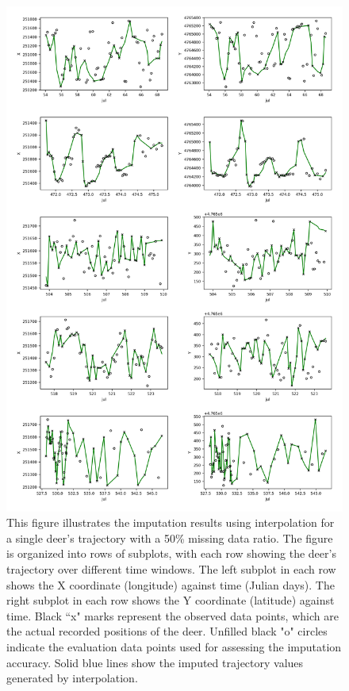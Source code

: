 \documentclass[11pt]{article}
\begin{document}
\begin{figure}[h]
  \centering
  \includegraphics[width=\textwidth]{../figure/50_5094_interpolation} %
  \caption{This figure illustrates the imputation results using interpolation for a single deer's trajectory with a 50\% missing data ratio. The figure is organized into rows of subplots, with each row showing the deer's trajectory over different time windows. The left subplot in each row shows the X coordinate (longitude) against time (Julian days). The right subplot in each row shows the Y coordinate (latitude) against time. Black ``x" marks represent the observed data points, which are the actual recorded positions of the deer. Unfilled black "o" circles indicate the evaluation data points used for assessing the imputation accuracy. Solid blue lines show the imputed trajectory values generated by interpolation.}
  \label{fig: interpolation_50} %
\end{figure}
\end{document}
